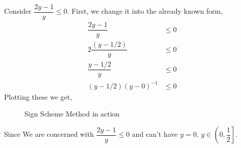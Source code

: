\begin{example}
    Consider \(\dfrac{2y-1}{y} \le 0\). First, we change it into the already known form,
    \begin{align}
        \dfrac{2y-1}{y} &\le 0\\
        2\dfrac{(y-1/2)}{y} &\le 0\\
        \dfrac{y-1/2}{y} &\le 0\\
        (y-1/2)(y-0)^{-1} &\le 0
    \end{align}
    Plotting these we get,
    \begin{figure}[H]
        \centering
        \caption{Sign Scheme Method in action}
    \end{figure}

    Since We are concerned with \(\dfrac{2y-1}{y} \le 0\) and can't have \(y=0\),
    \(y \in \left(0,\dfrac{1}{2}\right]\).
\end{example}